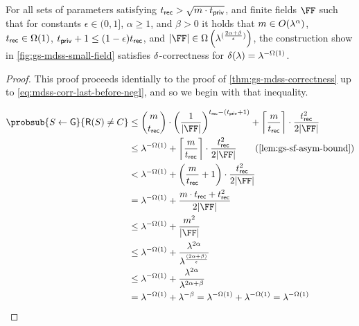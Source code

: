 \begin{theorem}
	For all sets of parameters satisfying $t_{\mathsf{rec}} > \sqrt{m \cdot t_{\mathsf{priv}}}$, and finite fields $\FF$ such that for constants $\epsilon \in (0, 1]$, $\alpha \geq 1$, and $\beta > 0$ it holds that $m \in O(\lambda^\alpha)$, $t_{\mathsf{rec}} \in \Omega(1)$, $t_{\mathsf{priv}} + 1 \leq (1 - \epsilon)t_{\mathsf{rec}}$, and $|\FF| \in \Omega\left(\secpar^{(\frac{2\alpha + \beta}{\epsilon})}\right)$,
	the construction show in \cref{fig:gs-mdss-small-field} satisfies $\delta$-correctness for $\delta(\lambda) =  \lambda^{-\Omega(1)}$.
\end{theorem}
\begin{proof}
	This proof proceeds identially to the proof of \cref{thm:gs-mdss-correctness} up to  \cref{eq:mdss-corr-last-before-negl}, and so we begin with that inequality.

	\begin{align*}
		\probsub{\mdssShareSet \gets \mdssG}{\mdssShortRecon(\mdssShareSet) \neq \mdssCS} & \leq
		\binom{\mdssMaxShares}{\mdssRecThr} \cdot \left(\frac{1}{|\FF|}\right)^{\mdssRecThr - (\mdssPrivThr + 1)} + \left\lceil\frac{\mdssMaxShares}{\mdssRecThr}\right\rceil \cdot \frac{\mdssRecThr^2}{2|\FF|} \\
		                                                                                  & \leq \secpar^{-\Omega(1)} + \mdssBPB \tag{\cref{lem:gs-sf-asym-bound}}                                               \\
		                                                                                  & < \secpar^{-\Omega(1)} + \left(\frac{\mdssMaxShares}{\mdssRecThr} + 1\right) \cdot \frac{\mdssRecThr^2}{2|\FF|}      \\
		                                                                                  & = \secpar^{-\Omega(1)} + \frac{\mdssMaxShares \cdot \mdssRecThr + \mdssRecThr^2}{2|\FF|}                             \\
		                                                                                  & \leq \secpar^{-\Omega(1)} + \frac{\mdssMaxShares^2}{|\FF|}                                                           \\
		                                                                                  & \leq \secpar^{-\Omega(1)} + \frac{\secpar^{2\alpha}}{\secpar^{\frac{(2\alpha + \beta)}{\epsilon}}}                   \\
		                                                                                  & \leq \secpar^{-\Omega(1)} + \frac{\secpar^{2\alpha}}{\secpar^{2\alpha + \beta}}                                      \\
		                                                                                  & = \secpar^{-\Omega(1)} + \secpar^{-\beta} = \secpar^{-\Omega(1)} + \secpar^{-\Omega(1)}  = \secpar^{-\Omega(1)}
	\end{align*}
\end{proof}

